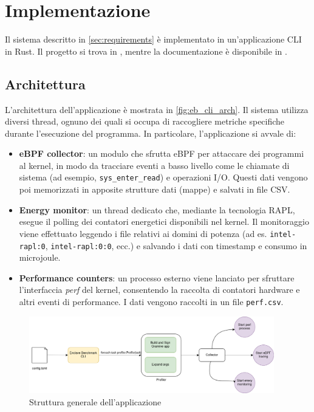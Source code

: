 \documentclass{article}
\begin{document}
\clearpage
\section{Implementazione}
Il sistema descritto in \cref{sec:requirements} è implementato in un'applicazione CLI in Rust. Il progetto si trova in \cite{eb-repo}, mentre la documentazione è disponibile in \cite{eb-docs}.
\subsection{Architettura}
L'architettura dell'applicazione è mostrata in \cref{fig:eb_cli_arch}. Il sistema utilizza diversi thread, ognuno dei quali si occupa di raccogliere metriche specifiche durante l'esecuzione del programma. In particolare, l'applicazione si avvale di:
\begin{itemize}
  \item \textbf{eBPF collector}: un modulo che sfrutta eBPF per attaccare dei programmi al kernel, in modo da tracciare eventi a basso livello come le chiamate di sistema (ad esempio, \texttt{sys\_enter\_read}) e operazioni I/O. Questi dati vengono poi memorizzati in apposite strutture dati (mappe) e salvati in file CSV.
  \item \textbf{Energy monitor}: un thread dedicato che, mediante la tecnologia RAPL, esegue il polling dei contatori energetici disponibili nel kernel. Il monitoraggio viene effettuato leggendo i file relativi ai domini di potenza (ad es. \texttt{intel-rapl:0}, \texttt{intel-rapl:0:0}, ecc.) e salvando i dati con timestamp e consumo in microjoule.
  \item \textbf{Performance counters}: un processo esterno viene lanciato per sfruttare l'interfaccia \textit{perf} del kernel, consentendo la raccolta di contatori hardware e altri eventi di performance. I dati vengono raccolti in un file \texttt{perf.csv}.
\end{itemize}

\begin{figure}
  \begin{center}
    \includegraphics[width=0.95\textwidth]{./figures/ch3/eb_cli_arch.png}
  \end{center}
  \caption{Struttura generale dell'applicazione}\label{fig:eb_cli_arch.png}
\end{figure}
\end{document}
